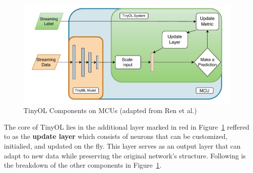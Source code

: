 \documentclass[twocolumn]{article}
\begin{document}
\begin{figure}
	\centerline{
	\includegraphics[width=1\columnwidth]{resource/tinyol_on_mcu.pdf}
	}
	\caption{TinyOL Components on MCUs (adapted from Ren et al.)}
	\label{TinyOL}
\end{figure}

The core of TinyOL lies in the additional layer marked in red in Figure~\ref{TinyOL} reffered to as the \textbf{update layer} which consists of neurons that can be customized, initialied, and updated on the fly. This layer serves as an output layer that can adapt to new data while preserving the original network's structure. Following is the breakdown of the other components in Figure~\ref{TinyOL}.
\end{document}
